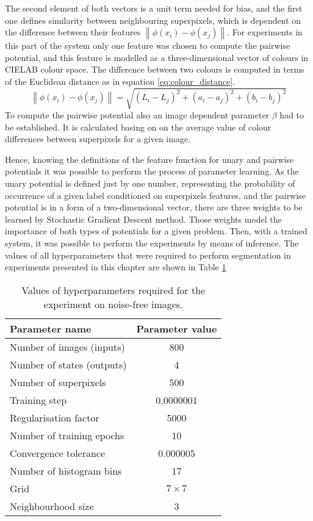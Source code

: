 The second element of both vectors is a unit term needed for bias, and the first one defines similarity between neighbouring superpixels, which is dependent on the difference between their features $ \left \| \phi(x_i) - \phi(x_j)\right \|$. For experiments in this part of the system only one feature was chosen to compute the pairwise potential, and this feature is modelled as a three-dimensional vector of colours in CIELAB colour space. The difference between two colours is computed in terms of the Euclidean distance as in equation \ref{eq:colour_distance}. 
\begin{equation}
    \label{eq:colour_distance}
    \left \| \phi(x_i) - \phi(x_j)\right \|=\sqrt {(L_i-L_j)^2+(a_i-a_j)^2+(b_i-b_j)^2}
\end{equation}
To compute the pairwise potential also an image dependent parameter $\beta$ had to be established. It is calculated basing on on the average value of colour differences between superpixels for a given image.

Hence, knowing the definitions of the feature function for unary and pairwise potentials it was possible to perform the process of parameter learning. As the unary potential is defined just by one number, representing the probability of occurrence of a given label conditioned on superpixels features, and the pairwise potential is in a form of a two-dimensional vector, there are three weights to be learned by Stochastic Gradient Descent method. Those weights model the importance of both types of potentials for a given problem. Then, with a trained system, it was possible to perform the experiments by means of inference.
\newline The values of all hyperparameters that were required to perform segmentation in experiments presented in this chapter are shown in Table \ref{table:hyperparameters_nonlinear}
\begin{table}[ht]
    \caption{Values of hyperparameters required for the experiment on noise-free images.}
    \centering
    \begin{tabular}{|l|c|}
        \hline
        \rowcolor[HTML]{cecaca} 
        \textbf{Parameter name} & \textbf{Parameter value} \\ \hline
        Number of images (inputs) & 800 \\ \hline
        Number of states (outputs) & 4 \\ \hline
        Number of superpixels & 500 \\ \hline
        Training step &  0.0000001 \\ \hline
        Regularisation factor & 5000 \\ \hline
        Number of training epochs & 10 \\ \hline
        Convergence tolerance & 0.000005 \\ \hline
        Number of histogram bins & 17 \\ \hline
        Grid & $7 \times 7$ \\ \hline
        Neighbourhood size & 3 \\ \hline
    \end{tabular}
    \label{table:hyperparameters_nonlinear}
\end{table}
